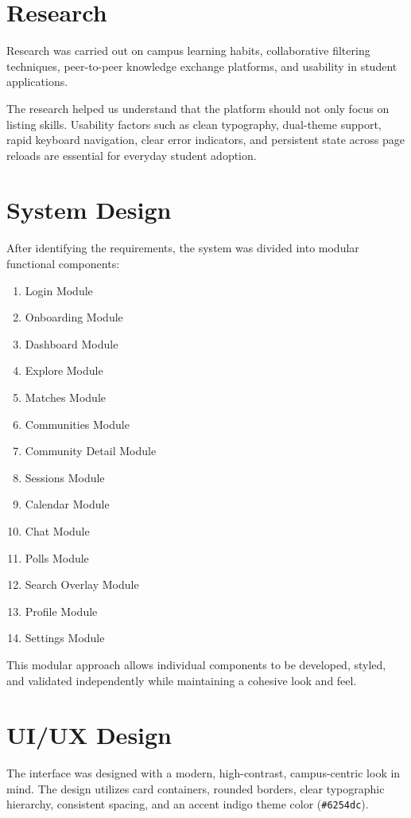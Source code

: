 \documentclass[12pt,a4paper]{report}
\begin{document}
\section{Research}
Research was carried out on campus learning habits, collaborative filtering techniques, peer-to-peer knowledge exchange platforms, and usability in student applications.

The research helped us understand that the platform should not only focus on listing skills. Usability factors such as clean typography, dual-theme support, rapid keyboard navigation, clear error indicators, and persistent state across page reloads are essential for everyday student adoption.

\section{System Design}
After identifying the requirements, the system was divided into modular functional components:
\begin{enumerate}
    \item Login Module
    \item Onboarding Module
    \item Dashboard Module
    \item Explore Module
    \item Matches Module
    \item Communities Module
    \item Community Detail Module
    \item Sessions Module
    \item Calendar Module
    \item Chat Module
    \item Polls Module
    \item Search Overlay Module
    \item Profile Module
    \item Settings Module
\end{enumerate}

This modular approach allows individual components to be developed, styled, and validated independently while maintaining a cohesive look and feel.

\section{UI/UX Design}
The interface was designed with a modern, high-contrast, campus-centric look in mind. The design utilizes card containers, rounded borders, clear typographic hierarchy, consistent spacing, and an accent indigo theme color (\texttt{\#6254dc}).
\end{document}
